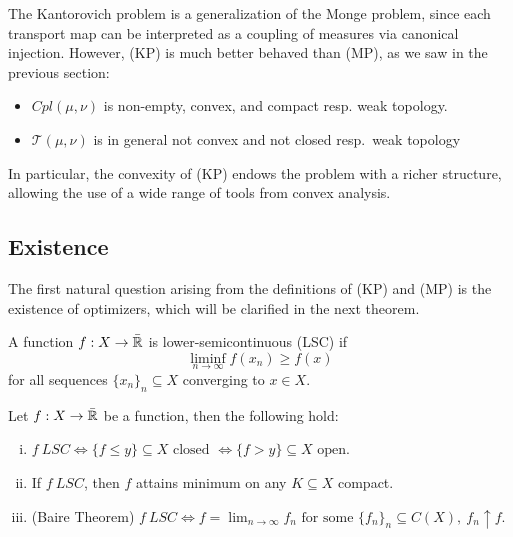 \documentclass[../main.tex]{subfiles}
\begin{document}
\begin{remark}
    The Kantorovich problem is a generalization of the Monge problem, since each transport map can be interpreted as a coupling of measures via canonical injection. However, (KP) is much better behaved than (MP), as we saw in the previous section:
    \begin{itemize}
        \item $Cpl(\mu, \nu)$ is non-empty, convex, and compact resp. weak topology.
        \item $\mathcal{T}(\mu, \nu)$ is in general not convex and not closed resp.\ weak topology
    \end{itemize}
    In particular, the convexity of (KP) endows the problem with a richer structure, allowing the use of a wide range of tools from convex analysis.
\end{remark}

\subsection{Existence}
The first natural question arising from the definitions of (KP) and (MP) is the existence of optimizers, which will be clarified in the next theorem.

\begin{definition}
    A function $f:X\to \bar{\mathbb{R}}$ is lower-semicontinuous (LSC) if $$\liminf_{n\to\infty} f(x_n)\geq f(x)$$ for all sequences $\{x_n\}_n\subseteq X$ converging to $x\in X$.
\end{definition}

\begin{lemma}
\label{lemma:lsc_propr}
    Let $f: X\to\bar{\mathbb{R}}$ be a function, then the following hold:
    \begin{enumerate}[(i)]
        \item $f \ LSC \iff \{f\leq y\}\subseteq X \text{ closed } \iff \{f > y\}\subseteq X \text{ open}$.
        \item If $f \ LSC $, then $f$ attains minimum on any $K\subseteq X$ compact.
        \item (Baire Theorem) $f \ LSC \iff f =\lim_{n\to\infty} f_n \text{ for some } \{f_n\}_n\subseteq C(X), \ f_n\uparrow f$.
    \end{enumerate}
\end{lemma}
\end{document}
